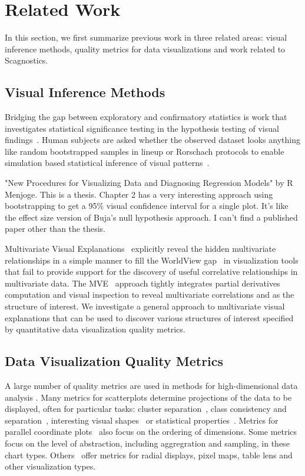 \section{Related Work}
\label{sec:related}
In this section, we first summarize previous work in three related areas: visual inference methods, quality metrics for data visualizations and work related to Scagnostics.

\subsection{Visual Inference Methods}
Bridging the gap between exploratory and confirmatory statistics is work that investigates statistical significance testing in the hypothesis testing of visual findings~\cite{Wickham2013,Majumder2013}. Human subjects are asked whether the observed dataset looks anything like random bootstrapped samples in lineup or Rorschach protocols to enable simulation based statistical inference of visual patterns~\cite{Buja2009}.

"New Procedures for Visualizing Data and Diagnosing Regression Models" by R Menjoge. This is a thesis. Chapter 2 has a very interesting approach using bootstrapping to get a 95\% visual confidence interval for a single plot. It's like the effect size version of Buja's null hypothesis approach. I can't find a published paper other than the thesis.

Multivariate Visual Explanations~\cite{Barlowe2008} explicitly reveal the hidden multivariate relationships in a simple manner to fill the WorldView gap~\cite{Amar2004} in visualization tools that fail to provide support for the discovery of useful correlative relationships in multivariate data. The MVE~\cite{Barlowe2008} approach tightly integrates partial derivatives computation and visual inspection to reveal multivariate correlations and as the structure of interest. We investigate a general approach to multivariate visual explanations that can be used to discover various structures of interest specified by quantitative data visualization quality metrics.

\subsection{Data Visualization Quality Metrics}
A large number of quality metrics are used in methods for high-dimensional data analysis \cite{Bertini2011}.  Many metrics for scatterplots determine projections of the data to be displayed, often for particular tasks: cluster separation~\cite{Sedlmair2012,Tatu2009}, class consistency and separation~\cite{Sips2009,Schafer2013}, interesting visual shapes~\cite{Wilkinson2005} or statistical properties~\cite{Kandel2012,Seo2005}. Metrics for parallel coordinate plots~\cite{Ankerst1998, Dasgupta2010, Johansson2009, Yang2003} also focus on the ordering of dimensions. Some metrics~\cite{Bertini2006, Cui2006} focus on the level of abstraction, including aggregration and sampling, in these chart types. Others~\cite{Albuquerque2010, Ankerst1998, Schneidewind2006, Yang2003} offer metrics for radial displays, pixel maps, table lens and other visualization types. 


